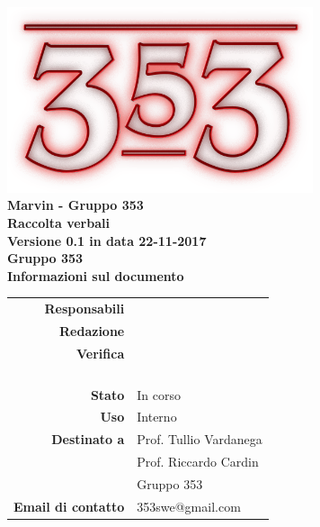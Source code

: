 \documentclass[openany, a4paper, 12pt]{report}
\begin{document}
\begin{titlepage}
	\centering
	\vfill
	{
		\bfseries
		\vskip2cm
		\includegraphics[width=9cm]{../../common/images/logo.png} \\
		\Large Marvin - Gruppo 353\\
		\vfill
		\Huge Raccolta verbali\\
		\Large Versione 0.1 in data 22-11-2017\\
		\vfill
		\large Gruppo 353\\
		\vfill
	\normalsize Informazioni sul documento\\
\begin{table}[htbp]
	\centering
	\renewcommand\arraystretch{1.2}
	\begin{tabular}{r|l}
		\hline
		\textbf{Responsabili}	& \Elena\\
		
		\textbf{Redazione} 		& \Mirco\\
		
		\textbf{Verifica} 		& \Parwinder\\
								& \Davide\\
								& \Gianluca\\
								& \Valentina\\
								& \Riccardo\\
						
		\textbf{Stato} 			& In corso\\
		\textbf{Uso}			& Interno\\
		\textbf{Destinato a}   	& Prof. Tullio Vardanega\\
								& Prof. Riccardo Cardin\\
								& Gruppo 353\\
		
						
		\textbf{Email di contatto}	& 353swe@gmail.com
	\end{tabular}
\end{table}
		\vfill
	}    
\end{titlepage}

\tableofcontents
\newpage
{}

 
\end{document}
